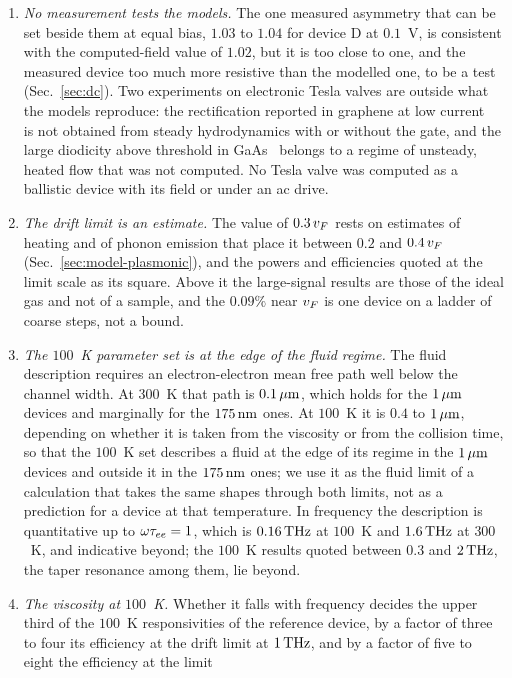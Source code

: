 \begin{enumerate}
\item \emph{No measurement tests the models.} The one measured asymmetry
that can be set beside them at equal bias, $1.03$ to $1.04$ for device D
at $0.1$~V, is consistent with the computed-field value of $1.02$, but it
is too close to one, and the measured device too much more resistive than
the modelled one, to be a test (Sec.~\ref{sec:dc}). Two experiments on
electronic Tesla valves are outside what the models reproduce: the
rectification reported in graphene at low
current~\cite{geurs2020rectification} is not obtained from steady
hydrodynamics with or without the gate, and the large diodicity above
threshold in GaAs~\cite{sarypov2026electron} belongs to a regime of
unsteady, heated flow that was not computed. No Tesla valve was computed
as a ballistic device with its field or under an ac drive.
\item \emph{The drift limit is an estimate.} The value of $0.3\,v_{F}$
rests on estimates of heating and of phonon emission that place it
between $0.2$ and $0.4\,v_{F}$ (Sec.~\ref{sec:model-plasmonic}), and the
powers and efficiencies quoted at the limit scale as its square. Above it
the large-signal results are those of the ideal gas and not of a sample,
and the $0.09\%$ near $v_{F}$ is one device on a ladder of coarse steps,
not a bound.
\item \emph{The $100$~K parameter set is at the edge of the fluid
regime.} The fluid description requires an electron-electron mean free
path well below the channel width. At $300$~K that path is $0.1\,\mu\mathrm{m}$,
which holds for the $1\,\mu\mathrm{m}$ devices and marginally for the $175\,\mathrm{nm}$ ones.
At $100$~K it is $0.4$ to $1\,\mu\mathrm{m}$, depending on whether it is taken from
the viscosity or from the collision time, so that the $100$~K set
describes a fluid at the edge of its regime in the $1\,\mu\mathrm{m}$ devices and
outside it in the $175\,\mathrm{nm}$ ones; we use it as the fluid limit of a
calculation that takes the same shapes through both limits, not as a
prediction for a device at that temperature. In frequency the
description is quantitative up to $\omega\tau_{ee}=1$, which is $0.16\,\mathrm{THz}$
at $100$~K and $1.6\,\mathrm{THz}$ at $300$~K, and indicative beyond; the $100$~K
results quoted between $0.3$ and $2\,\mathrm{THz}$, the taper resonance among them,
lie beyond.
\item \emph{The viscosity at $100$~K.} Whether it falls with frequency
decides the upper third of the $100$~K responsivities of the reference
device, by a factor of three to four its efficiency at the drift limit at
$1\,\mathrm{THz}$, and by a factor of five to eight the efficiency at the limit

\end{enumerate}
